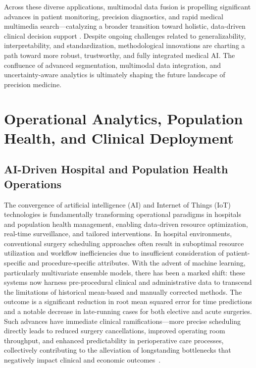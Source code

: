 \documentclass[sigconf]{acmart}
\begin{document}
Across these diverse applications, multimodal data fusion is propelling significant advances in patient monitoring, precision diagnostics, and rapid medical multimedia search—catalyzing a broader transition toward holistic, data-driven clinical decision support \cite{ref41,ref42,ref50,ref61,ref65,ref70,ref71,ref86,ref89,ref90,ref104,ref105}. Despite ongoing challenges related to generalizability, interpretability, and standardization, methodological innovations are charting a path toward more robust, trustworthy, and fully integrated medical AI. The confluence of advanced segmentation, multimodal data integration, and uncertainty-aware analytics is ultimately shaping the future landscape of precision medicine.

\section{Operational Analytics, Population Health, and Clinical Deployment}

\subsection{AI-Driven Hospital and Population Health Operations}

The convergence of artificial intelligence (AI) and Internet of Things (IoT) technologies is fundamentally transforming operational paradigms in hospitals and population health management, enabling data-driven resource optimization, real-time surveillance, and tailored interventions. In hospital environments, conventional surgery scheduling approaches often result in suboptimal resource utilization and workflow inefficiencies due to insufficient consideration of patient-specific and procedure-specific attributes. With the advent of machine learning, particularly multivariate ensemble models, there has been a marked shift: these systems now harness pre-procedural clinical and administrative data to transcend the limitations of historical mean-based and manually corrected methods. The outcome is a significant reduction in root mean squared error for time predictions and a notable decrease in late-running cases for both elective and acute surgeries. Such advances have immediate clinical ramifications—more precise scheduling directly leads to reduced surgery cancellations, improved operating room throughput, and enhanced predictability in perioperative care processes, collectively contributing to the alleviation of longstanding bottlenecks that negatively impact clinical and economic outcomes~\cite{ref81}.
\end{document}
